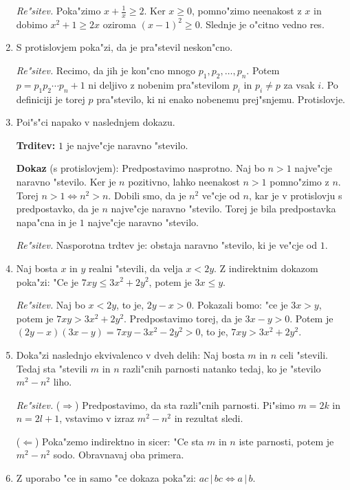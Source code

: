 \documentclass[11pt,paper=b5,footinclude,headinclude]{scrbook} %
\begin{document}
\begin{enumerate}
\emph{ Re"sitev.} Poka"zimo $x + \frac{1}{x}\geq 2$. Ker $x\geq 0$, pomno"zimo neenakost z $x$ in dobimo
$x^2 + 1 \geq 2x$ oziroma $(x- 1)^2\geq 0$. Slednje je o"citno vedno res.

\item S protislovjem poka"zi, da je pra"stevil neskon"cno.

\emph{ Re"sitev.} Recimo, da jih je kon"cno mnogo $p_1,p_2,\ldots, p_n$. Potem  $p=p_1p_2\cdots p_n+1$ ni deljivo z nobenim pra"stevilom $p_i$ in $p_i\neq p$ za vsak $i$. Po definiciji je torej $p$ pra"stevilo, ki ni enako nobenemu prej"snjemu. Protislovje.

\item Poi"s"ci napako v naslednjem dokazu. 

\textbf{Trditev:} $1$ je najve"cje naravno "stevilo. 

\textbf{Dokaz} (s protislovjem):
Predpostavimo nasprotno. Naj bo $n>1$ najve"cje naravno "stevilo. Ker je $n$ pozitivno, lahko neenakost $n>1$ pomno"zimo z $n$. Torej $n>1\Leftrightarrow n^2>n$. Dobili smo, da je $n^2$ ve"cje od $n$, kar je v protislovju s predpostavko, da je $n$ najve"cje naravno "stevilo. Torej je bila predpostavka napa"cna in je $1$ najve"cje naravno "stevilo.

\emph{ Re"sitev.} Nasporotna trdtev je: obstaja naravno "stevilo, ki je ve"cje od $1$.


\item Naj bosta $x$ in $y$ realni "stevili, da velja $x<2y$. Z indirektnim dokazom poka"zi: "Ce je $7xy\leq 3x^2 + 2y^2$, potem je $3x\leq y$.

\emph{ Re"sitev.} Naj bo $x<2y$, to je, $2y-x>0$. Pokazali bomo: "ce je $3x> y$, potem je $7xy > 3x^2 + 2y^2$. Predpostavimo torej, da je $3x-y>0$. Potem je $(2y-x)(3x-y)= 7xy - 3x^2 - 2y^2>0$, to je, $7xy > 3x^2 + 2y^2$.

\item Doka"zi naslednjo ekvivalenco v dveh delih: Naj bosta $m$ in $n$ celi "stevili. Tedaj sta "stevili $m$ in $n$ razli"cnih parnosti natanko tedaj, ko je "stevilo $m^2- n^2$ liho.

\emph{ Re"sitev.} ($\Rightarrow$) Predpostavimo, da sta razli"cnih parnosti. Pi"simo  $m=2k$ in $n=2l+1$, vstavimo v izraz $m^2- n^2$ in rezultat sledi.

($\Leftarrow$) Poka"zemo indirektno in sicer: "Ce sta $m$ in $n$ iste parnosti, potem je $m^2- n^2$ sodo. Obravnavaj oba primera.


\item Z uporabo "ce in samo "ce dokaza poka"zi: $ac\,|\,bc \Leftrightarrow a\,|\,b$.


\end{enumerate}
\end{document}
